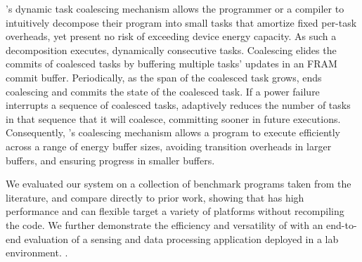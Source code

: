 \sys's dynamic task coalescing mechanism allows the programmer or a compiler to
intuitively decompose their program into small tasks that amortize fixed
per-task overheads, yet present no risk of exceeding device energy capacity. As
such a decomposition executes,  dynamically consecutive
tasks. Coalescing elides the commits of coalesced tasks by buffering multiple
tasks' updates in an FRAM commit buffer. Periodically, as the span of the
coalesced task grows, \sys ends coalescing and commits the state of the
coalesced task. If a power failure interrupts a sequence of coalesced tasks,
\sys adaptively reduces the number of tasks in that sequence that it will
coalesce, committing sooner in future executions. Consequently, \sys's
coalescing mechanism allows a program to execute efficiently across a range of
energy buffer sizes, avoiding transition overheads in larger buffers, and
ensuring progress in smaller buffers. 

We evaluated our system on a collection of benchmark programs taken from the
literature, and compare directly to prior work, showing that \sys has high
performance and can flexible target a variety of platforms without recompiling
the code. We further demonstrate the efficiency and versatility of \sys with
an end-to-end evaluation of a sensing and data processing application deployed
in a lab environment. .

